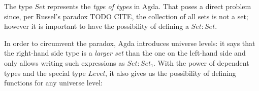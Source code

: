 {The type $Set$ represents the \emph{type of types} in Agda. That poses a direct problem since, per Russel's paradox TODO CITE, the collection of all sets is not a set; however it is important to have the possibility of defining a $Set : Set$.

In order to circumvent the paradox, Agda introduces universe levels: it says that the right-hand side type is a \emph{larger set} than the one on the left-hand side and only allows writing such expressions as $Set : Set₁$. With the power of dependent types and the special type $Level$, it also gives us the possibility of defining functions for any universe level:

\begin{code}%
\>[0]\AgdaSpace{}%
\AgdaSpace{}%
\<%
\\
%
\\[\AgdaEmptyExtraSkip]%
\>[0]\AgdaSpace{}%
\AgdaSpace{}%
\AgdaSymbol{\{}\AgdaSpace{}%
\AgdaSymbol{:}\AgdaSpace{}%
\AgdaSymbol{\}}\AgdaSpace{}%
\AgdaSymbol{(}\AgdaSpace{}%
\AgdaSymbol{:}\AgdaSpace{}%
\AgdaSpace{}%
\AgdaSymbol{)}\AgdaSpace{}%
\AgdaSymbol{:}\AgdaSpace{}%
\AgdaSpace{}%
\AgdaSpace{}%
\<%
\\
\>[0][@{}l@{\AgdaIndent{0}}]%
\>[2]\AgdaInductiveConstructor{[]}%
\>[7]\AgdaSymbol{:}\AgdaSpace{}%
\AgdaSpace{}%
\<%
\\
%
\>[2]\AgdaOperator{\AgdaInductiveConstructor{\AgdaUnderscore{}::\AgdaUnderscore{}}}\AgdaSpace{}%
\AgdaSymbol{:}\AgdaSpace{}%
\AgdaSpace{}%
\AgdaSpace{}%
\AgdaSpace{}%
\AgdaSpace{}%
\AgdaSpace{}%
\AgdaSpace{}%
\<%
\end{code}}
